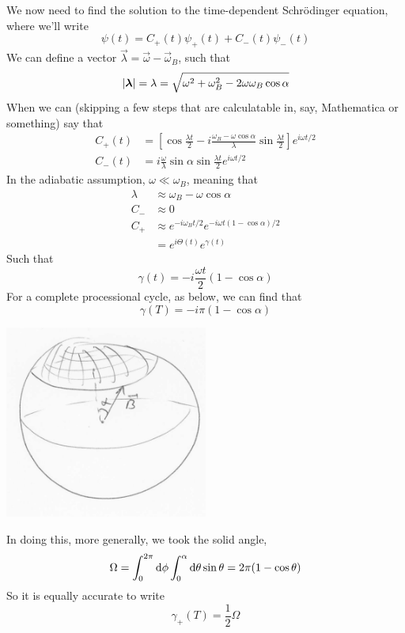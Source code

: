 \documentclass[a4paper]{article}
\begin{document}
We now need to find the solution to the time-dependent Schr\"odinger equation,
where we'll write
\[
	\psi(t) = C_+(t)\psi_+(t) + C_-(t)\psi_-(t)
\]
We can define a vector $\vec{\lambda} = \vec{\omega}-\vec{\omega}_B$, such that
\[
	\left\lvert \boldsymbol{\mathbf{\lambda}}\right\rvert = \lambda =
	\sqrt{\omega^2 + \omega_B^2 - 2\omega\omega_B\cos\alpha}
\]
When we can (skipping a few steps that are calculatable in, say, Mathematica or
something) say that
\begin{align*}
	C_+(t) &= \left[\cos\frac{\lambda t}{2} -
		i\frac{\omega_B-\omega\cos\alpha}{\lambda}
		\sin\frac{\lambda t}{2}\right]
		e^{i\omega t/2}\\
	C_-(t) &= i\frac{\omega}{\lambda}\sin\alpha
		\sin\frac{\lambda t}{2} e^{i\omega t/2}
\end{align*}
In the adiabatic assumption, $\omega \ll \omega_B$, meaning that
\begin{align*}
	\lambda &\approx \omega_B - \omega\cos\alpha\\
	C_- &\approx 0\\
	C_+ &\approx e^{-i\omega_B t/2} e^{-i\omega t(1-\cos\alpha)/2}\\
	    &= e^{i\Theta(t)}e^{\gamma(t)}
\end{align*}
Such that
\[
	\gamma(t) = -i\frac{\omega t}{2} (1-\cos\alpha)
\]
For a complete processional cycle, as below, we can find that
\[
	\gamma(T) = -i\pi(1-\cos\alpha)
\]
\begin{center}
	\includegraphics[width=0.5\textwidth]{BerrysField1.png}
\end{center}
In doing this, more generally, we took the solid angle,
\[
	\Omega = \int_0^{2\pi}\mathrm{d}\phi\int_0^\alpha\mathrm{d}\theta\sin\theta
		= 2\pi(1-\cos\theta)
\]
So it is equally accurate to write
\[
	\gamma_+(T) = \frac{1}{2}\Omega
\]
\end{document}
